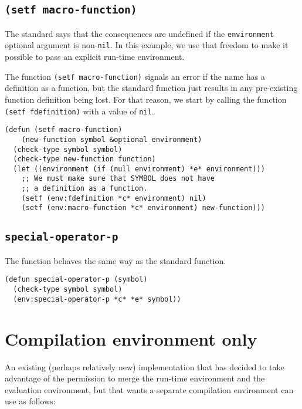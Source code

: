 \subsection{\texttt{(setf macro-function)}}

The standard says that the consequences are undefined if the
\texttt{environment} optional argument is non-\texttt{nil}.  In this
example, we use that freedom to make it possible to pass an explicit
run-time environment.

The \sysname{} function \texttt{(setf macro-function)} signals an
error if the name has a definition as a function, but the standard
function just results in any pre-existing function definition being
lost.  For that reason, we start by calling the \sysname{} function
\texttt{(setf fdefinition)} with a value of \texttt{nil}.

\begin{verbatim}
(defun (setf macro-function)
    (new-function symbol &optional environment)
  (check-type symbol symbol)
  (check-type new-function function)
  (let ((environment (if (null environment) *e* environment)))
    ;; We must make sure that SYMBOL does not have
    ;; a definition as a function.
    (setf (env:fdefinition *c* environment) nil)
    (setf (env:macro-function *c* environment) new-function)))
\end{verbatim}

\subsection{\texttt{special-operator-p}}

The \sysname{} function behaves the same way as the standard function.

\begin{verbatim}
(defun special-operator-p (symbol)
  (check-type symbol symbol)
  (env:special-operator-p *c* *e* symbol))
\end{verbatim}

\section{Compilation environment only}

An existing (perhaps relatively new) \commonlisp{} implementation that
has decided to take advantage of the permission to merge the run-time
environment and the evaluation environment, but that wants a separate
compilation environment can use \sysname{} as follows:

